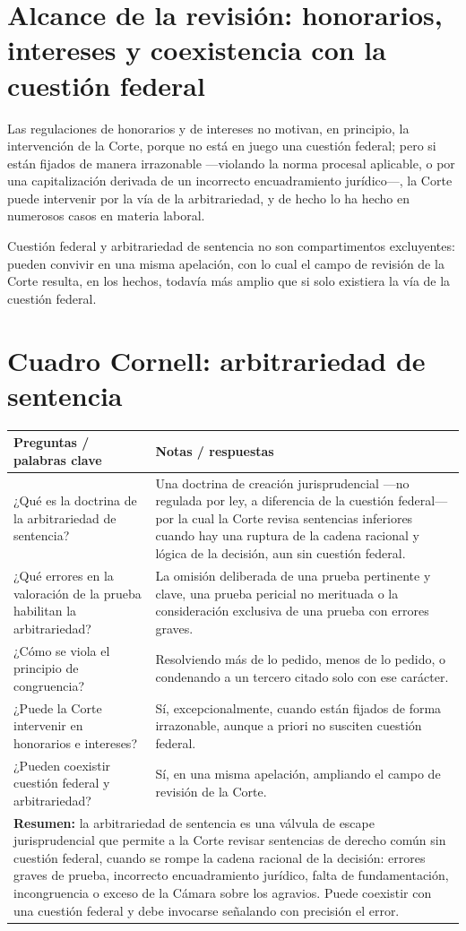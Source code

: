 \documentclass[12pt,oneside]{book}
\begin{document}
\section{Alcance de la revisión: honorarios, intereses y coexistencia con la cuestión federal}

Las regulaciones de honorarios y de intereses no motivan, en principio, la
intervención de la Corte, porque no está en juego una cuestión federal; pero si
están fijados de manera irrazonable —violando la norma procesal aplicable, o por
una capitalización derivada de un incorrecto encuadramiento jurídico—, la Corte
puede intervenir por la vía de la arbitrariedad, y de hecho lo ha hecho en
numerosos casos en materia laboral.

Cuestión federal y arbitrariedad de sentencia no son compartimentos excluyentes:
pueden convivir en una misma apelación, con lo cual el campo de revisión de la
Corte resulta, en los hechos, todavía más amplio que si solo existiera la vía de
la cuestión federal.

\section{Cuadro Cornell: arbitrariedad de sentencia}

\begin{longtable}{@{}p{}p{}@{}}
\toprule
\textbf{Preguntas / palabras clave} & \textbf{Notas / respuestas} \\
\midrule
\endhead
¿Qué es la doctrina de la arbitrariedad de sentencia? & Una doctrina de creación
jurisprudencial —no regulada por ley, a diferencia de la cuestión federal— por la
cual la Corte revisa sentencias inferiores cuando hay una ruptura de la cadena
racional y lógica de la decisión, aun sin cuestión federal. \\
¿Qué errores en la valoración de la prueba habilitan la arbitrariedad? & La
omisión deliberada de una prueba pertinente y clave, una prueba pericial no
merituada o la consideración exclusiva de una prueba con errores graves. \\
¿Cómo se viola el principio de congruencia? & Resolviendo más de lo pedido, menos
de lo pedido, o condenando a un tercero citado solo con ese carácter. \\
¿Puede la Corte intervenir en honorarios e intereses? & Sí, excepcionalmente,
cuando están fijados de forma irrazonable, aunque a priori no susciten cuestión
federal. \\
¿Pueden coexistir cuestión federal y arbitrariedad? & Sí, en una misma apelación,
ampliando el campo de revisión de la Corte. \\
\midrule
\multicolumn{2}{p{0.95\textwidth}}{\textbf{Resumen:} la arbitrariedad de
sentencia es una válvula de escape jurisprudencial que permite a la Corte revisar
sentencias de derecho común sin cuestión federal, cuando se rompe la cadena
racional de la decisión: errores graves de prueba, incorrecto encuadramiento
jurídico, falta de fundamentación, incongruencia o exceso de la Cámara sobre los
agravios. Puede coexistir con una cuestión federal y debe invocarse señalando con
precisión el error.} \\
\bottomrule
\end{longtable}
\end{document}
